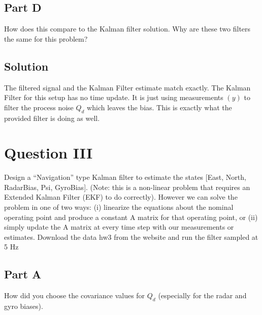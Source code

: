 \documentclass{article}
\begin{document}
\subsection*{Part D}
How does this compare to the Kalman filter solution.  Why are these two filters the same for this problem?
\subsection*{Solution}
The filtered signal and the Kalman Filter estimate match exactly.  The Kalman Filter for this setup has no time update.  It is just using measurements $(y)$ to filter the process noise $Q_d$ which leaves the bias.  This is exactly what the provided filter is doing as well.

\section*{Question III}
Design a “Navigation” type Kalman filter to estimate the states [East, North,
Radar\textunderscore Bias, Psi, Gyro\textunderscore Bias]. (Note: this is a non-linear problem that requires an
Extended Kalman Filter (EKF) to do correctly). However we can solve the problem in
one of two ways: (i) linearize the equations about the nominal operating point and
produce a constant A matrix for that operating point, or (ii) simply update the A matrix
at every time step with our measurements or estimates. Download the data hw3
from the website and run the filter sampled at 5 Hz
\subsection*{Part A}
How did you choose the covariance values for $Q_d$ (especially for the radar and gyro biases).
\end{document}
